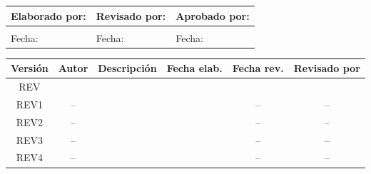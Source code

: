\newpage
\thispagestyle{corporativo}

\vspace*{1.5cm}

\centering
{\Large\bfseries \projecttitle}

\vspace{4cm}



\centering
\fontsize{10}{12}\selectfont
\renewcommand{\arraystretch}{1.3}
\setlength{\tabcolsep}{3pt}

\begin{tabular}{|p{}|p{}|p{}|}
	\hline
	\rowcolor{green!15}
	\textbf{Elaborado por:} & \textbf{Revisado por:} & \textbf{Aprobado por:} \\
	\hline
	\centering\arraybackslash\rule{0pt}{1.5cm} \firmaElaboro & \centering\arraybackslash\rule{0pt}{1.5cm} \firmaReviso & \centering\arraybackslash\rule{0pt}{1.5cm} \firmaAprobo \\
	\hline
	\centering\arraybackslash Fecha: \fechaElaboro & \centering\arraybackslash Fecha: \fechaReviso & \centering\arraybackslash Fecha: \fechaAprobo \\
	\hline
\end{tabular}

\vspace{2.5cm}

\centering
\fontsize{10}{12}\selectfont
\renewcommand{\arraystretch}{1.2}
\setlength{\tabcolsep}{3pt}

\begin{tabular}{|c|c|p{}|c|c|c|}
	\hline
	\rowcolor{green!15}
	\textbf{Versión} & \textbf{Autor} & \textbf{Descripción} & \textbf{Fecha elab.} & \textbf{Fecha rev.} & \textbf{Revisado por} \\
	\hline
	REV\docRevision & \firmaElaboro & \descRevCero & \fechaElaboro & \fechaReviso & \firmaReviso \\
	\hline
	REV1 & -- & \descRevUno & \fechaRevUno & -- & -- \\
	\hline
	REV2 & -- & \descRevDos & \fechaRevDos & -- & -- \\
	\hline
	REV3 & -- & \descRevTres & \fechaRevTres & -- & -- \\
	\hline
	REV4 & -- & \descRevCuatro & \fechaRevCuatro & -- & -- \\
	\hline
\end{tabular}

\vfill

\newpage
